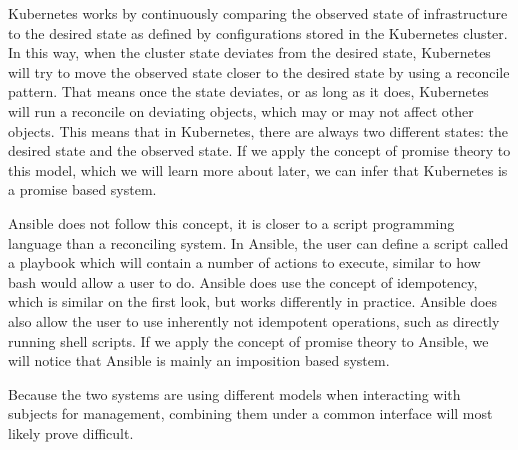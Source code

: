 Kubernetes works by continuously comparing the observed state of infrastructure to the desired state as defined by configurations stored in the Kubernetes cluster.
In this way, when the cluster state deviates from the desired state, Kubernetes will try to move the observed state closer to the desired state by using a \gls{reconcile} pattern.
That means once the state deviates, or as long as it does, Kubernetes will run a reconcile on deviating objects, which may or may not affect other objects.
This means that in Kubernetes, there are always two different states: the desired state and the observed state.
If we apply the concept of promise theory to this model, which we will learn more about later, we can infer that Kubernetes is a promise based system.

Ansible does not follow this concept, it is closer to a script programming language than a reconciling system.
In Ansible, the user can define a script called a playbook which will contain a number of actions to execute, similar to how bash would allow a user to do.
Ansible does use the concept of \gls{idempotency}, which is similar on the first look, but works differently in practice.
Ansible does also allow the user to use inherently not idempotent operations, such as directly running shell scripts.
If we apply the concept of promise theory to Ansible, we will notice that Ansible is mainly an imposition based system.

Because the two systems are using different models when interacting with subjects for management, combining them under a common interface will most likely prove difficult.
